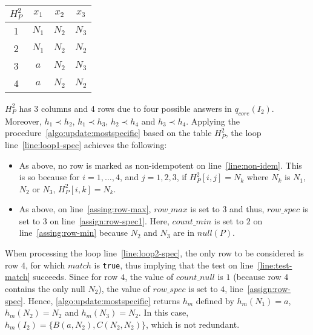 \begin{example}
    \begin{center}
        \begin{tabular}{c|ccc}
            $H_P^2$ & $x_1$  & $x_2$ & $x_3$ \\ \hline
            1       & $N_1 $ & $N_2$ & $N_3$ \\
            2       & $N_1$  & $N_2$ & $N_2$ \\
            3       & $a$    & $N_2$ & $N_3$ \\
            4       & $a$    & $N_2$ & $N_2$ \\
        \end{tabular}
    \end{center}
    $H_P^2$ has 3 columns and 4 rows due to four possible answers in $q_{core}(I_2)$.
    Moreover,
    $h_1 \prec h_2$, $h_1 \prec h_3$, $h_2 \prec h_4$ and $h_3 \prec h_4$.
    Applying the procedure~\ref{algo:update:mostspecific} based on the table $H_P^2$, the loop line~\ref{line:loop1-spec} achieves the following:
    \begin{itemize}
        \item
              As above, no row is marked as non-idempotent on line~\ref{line:non-idem}.
              This is so because for $i=1, \ldots, 4$, and $j=1,2,3$, if $H^2_P[i,j]=N_k$ where $N_k$ is $N_1$, $N_2$ or $N_3$, $H^2_P[i,k]=N_k$.
        \item
              As above, on line~\ref{assing:row-max}, $row\_max$ is set to $3$ and thus, $row\_spec$ is set to $3$ on line~\ref{assign:row-spec1}.
              Here, $count\_min$ is set to $2$ on line~\ref{assing:row-min} because $N_2$ and $N_3$ are in $null(P)$.
    \end{itemize}
    When processing the loop line~\ref{line:loop2-spec}, the only row to be considered is row $4$, for which $match$ is {\tt true}, thus implying that the test on line~\ref{line:test-match} succeeds.
    Since for row $4$, the value of $count\_null$ is $1$ (because row $4$ contains the only null $N_2$), the value of $row\_spec$ is set to $4$, line~\ref{assign:row-spec}.
    Hence, \ref{algo:update:mostspecific} returns $h_m$ defined by $h_m(N_1)=a$, $h_m(N_2)=N_2$ and $h_m(N_3)=N_2$.
    In this case,  $h_m(I_2)=\{B(a, N_2), C(N_2,N_2)\}$, which is not redundant.
\end{example}



